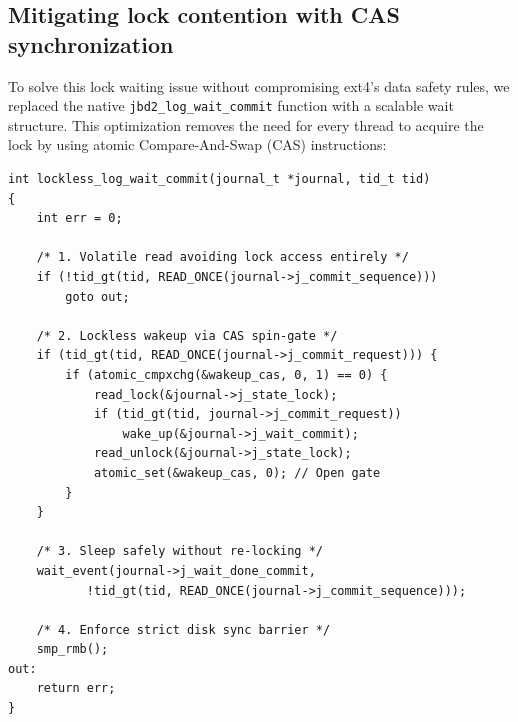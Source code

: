 \documentclass[12pt,a4paper]{article}
\begin{document}
\subsection{Mitigating lock contention with CAS synchronization}

To solve this lock waiting issue without compromising ext4's data
safety rules, we replaced the native
\texttt{jbd2\_log\_wait\_commit} function with a scalable wait
structure. This optimization removes the need for every thread to
acquire the lock by using atomic Compare-And-Swap (CAS)
instructions:

\begin{lstlisting}[caption={Optimized CAS lockless implementation}]
int lockless_log_wait_commit(journal_t *journal, tid_t tid)
{
    int err = 0;

    /* 1. Volatile read avoiding lock access entirely */
    if (!tid_gt(tid, READ_ONCE(journal->j_commit_sequence)))
        goto out;

    /* 2. Lockless wakeup via CAS spin-gate */
    if (tid_gt(tid, READ_ONCE(journal->j_commit_request))) {
        if (atomic_cmpxchg(&wakeup_cas, 0, 1) == 0) {
            read_lock(&journal->j_state_lock);
            if (tid_gt(tid, journal->j_commit_request))
                wake_up(&journal->j_wait_commit);
            read_unlock(&journal->j_state_lock);
            atomic_set(&wakeup_cas, 0); // Open gate
        }
    }

    /* 3. Sleep safely without re-locking */
    wait_event(journal->j_wait_done_commit,
           !tid_gt(tid, READ_ONCE(journal->j_commit_sequence)));

    /* 4. Enforce strict disk sync barrier */
    smp_rmb();
out:
    return err;
}
\end{lstlisting}
\end{document}

